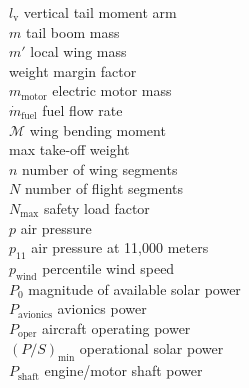 \begin{multicols}{2}
\begin{tabbing}
$l_\text{v}$ \> vertical tail moment arm \\ %
$m$ \> tail boom mass \\ %
$m'$ \> local wing mass \\ %
\DIFdelbegin {}\DIFdelend %
\DIFaddbegin {}\DIFaddend \> \DIFdelbegin {}%
\DIFdelend weight margin factor \\
$m_{\text{motor}}$ \> electric motor mass \\
$\dot{m}_{\text{fuel}}$ \> fuel flow rate \\ %
$\mathcal{M}$ \> wing bending moment \\ %
\DIFdelbegin {}\DIFdelend \DIFaddbegin {}\DIFaddend \> max take-off weight \\ %
$n$ \> number of wing segments \\
$N$ \> number of flight segments \\
$N_{\text{max}}$ \> safety load factor\\
$p$ \> air pressure \\ %
$p_{11}$ \> air pressure at 11,000 meters \\ %
$p_{\text{wind}}$ \> percentile wind speed \\
$P_{0}$ \> magnitude of available solar power \\ %
$P_{\text{avionics}}$ \> avionics power \\ %
$P_{\text{oper}}$ \> aircraft operating power \\ %
$(P/S)_{\text{min}}$ \> \DIFdelbegin {}\DIFdelend \DIFaddbegin {}\DIFaddend operational solar power \\ %
$P_{\text{shaft}}$ \> engine/motor shaft power \\ %

\end{tabbing}
\end{multicols}
